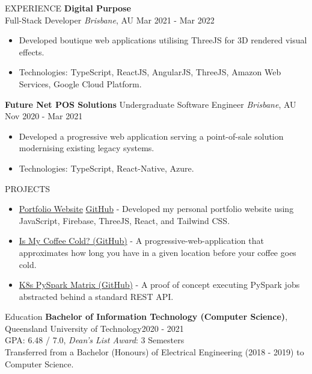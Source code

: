 \documentclass{resume}
\begin{document}
\begin{rSection}{EXPERIENCE}
      \textbf{Digital Purpose}\\
      Full-Stack Developer \hfill \textit{Brisbane}, AU \textbar\space Mar 2021 - Mar 2022
      \begin{itemize}
         \item Developed boutique web applications utilising ThreeJS for 3D rendered visual effects.
         \item Technologies: TypeScript, ReactJS, AngularJS, ThreeJS, Amazon Web Services, Google Cloud Platform.
      \end{itemize}
      
      \textbf{Future Net POS Solutions}
      Undergraduate Software Engineer \hfill \textit{Brisbane}, AU \textbar\space Nov 2020 - Mar 2021
      \begin{itemize}
         \item Developed a progressive web application serving a point-of-sale solution modernising existing legacy systems.
         \item Technologies: TypeScript, React-Native, Azure.
      \end{itemize}
   \end{rSection} 

   \begin{rSection}{PROJECTS}
      \begin{itemize}
         \item \href{https://jim-t-kelly.web.app/}{Portfolio Website} \textbar\space \href{https://github.com/jamestkelly/personal-portfolio}{GitHub} - Developed my personal portfolio website using JavaScript, Firebase, ThreeJS, React, and Tailwind CSS.
         \item \href{https://github.com/jamestkelly/is-my-coffee-cold}{Is My Coffee Cold? (GitHub)} - A progressive-web-application that approximates how long you have in a given location before your coffee goes cold.
         \item \href{https://github.com/jamestkelly/K8s-PySpark-Matrix}{K8s PySpark Matrix (GitHub)} - A proof of concept executing PySpark jobs abstracted behind a standard REST API.
      \end{itemize}
   \end{rSection} 

   \begin{rSection}{Education}
      {\bf Bachelor of Information Technology (Computer Science)}, Queensland University of Technology\hfill {2020 - 2021}\\
      GPA: 6.48 / 7.0, \textit{Dean's List Award}: 3 Semesters\\
      Transferred from a Bachelor (Honours) of Electrical Engineering (2018 - 2019) to Computer Science.
   \end{rSection}
\end{document}
